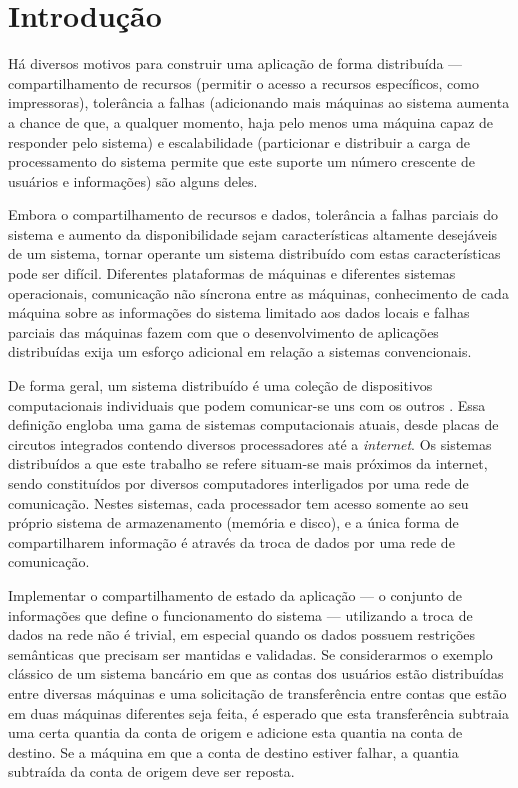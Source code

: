 \documentclass[11pt,twoside,a4paper]{book}
\begin{document}
\mainmatter

\fancyhead[RE,LO]{\thesection}

\singlespacing              %

\chapter{Introdução}
\label{chap:introducao}
Há diversos motivos para construir uma aplicação de forma distribuída --- compartilhamento de recursos (permitir o acesso a recursos específicos, como impressoras), tolerância a falhas (adicionando mais máquinas ao sistema aumenta a chance de que, a qualquer momento, haja pelo menos uma máquina capaz de responder pelo sistema) e escalabilidade (particionar e distribuir a carga de processamento do sistema permite que este suporte um número crescente de usuários e informações) são alguns deles.

Embora o compartilhamento de recursos e dados, tolerância a falhas parciais do sistema e aumento da disponibilidade sejam características altamente desejáveis de um sistema, tornar operante um sistema distribuído com estas características pode ser difícil. Diferentes plataformas de máquinas e diferentes sistemas operacionais, comunicação não síncrona entre as máquinas, conhecimento de cada máquina sobre as informações do sistema limitado aos dados locais e falhas parciais das máquinas fazem com que o desenvolvimento de aplicações distribuídas exija um esforço adicional em relação a sistemas convencionais.

De forma geral, um sistema distribuído é uma coleção de dispositivos computacionais individuais que podem comunicar-se uns com os outros \cite{tanenbaum}\cite{distributed_computing}. Essa definição engloba uma gama de sistemas computacionais atuais, desde placas de circutos integrados contendo diversos processadores até a \emph{internet}. Os sistemas distribuídos a que este trabalho se refere situam-se mais próximos da internet, sendo constituídos por diversos computadores interligados por uma rede de comunicação. Nestes sistemas, cada processador tem acesso somente ao seu próprio sistema de armazenamento (memória e disco), e a única forma de compartilharem informação é através da troca de dados por uma rede de comunicação.

Implementar o compartilhamento de estado da aplicação --- o conjunto de informações que define o funcionamento do sistema --- utilizando a troca de dados na rede não é trivial, em especial quando os dados possuem restrições semânticas que precisam ser mantidas e validadas. Se considerarmos o exemplo clássico de um sistema bancário em que as contas dos usuários estão distribuídas entre diversas máquinas e uma solicitação de transferência entre contas que estão em duas máquinas diferentes seja feita, é esperado que esta transferência subtraia uma certa quantia da conta de origem e adicione esta quantia na conta de destino. Se a máquina em que a conta de destino estiver falhar, a quantia subtraída da conta de origem deve ser reposta.
\end{document}
